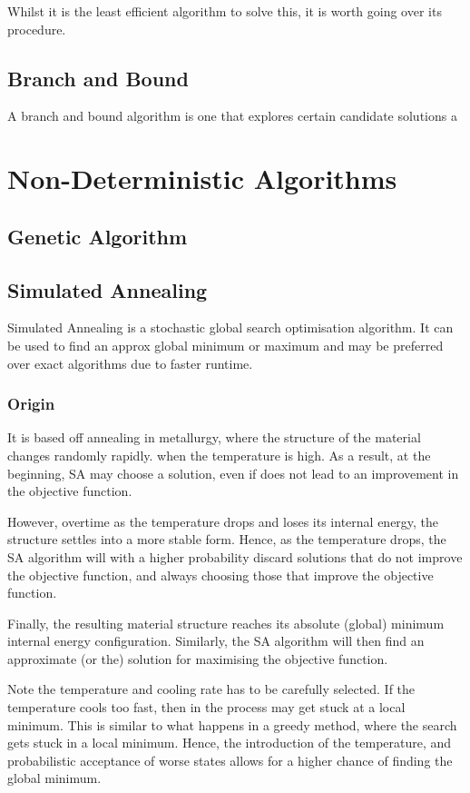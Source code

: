 \documentclass{article}
\begin{document}
Whilst it is the least efficient algorithm to solve this, it is worth going over its procedure.


\subsection{Branch and Bound}

A branch and bound algorithm is one that explores certain candidate solutions a

\section{Non-Deterministic Algorithms}

\subsection{Genetic Algorithm}

\subsection{Simulated Annealing}

Simulated Annealing is a stochastic global search optimisation algorithm.
It can be used to find an approx global minimum or maximum and may be preferred over exact algorithms due to faster runtime.
\\

\subsubsection{Origin}
It is based off annealing in metallurgy, where the structure of the material changes randomly rapidly. when the temperature is high.
As a result, at the beginning, SA may choose a solution, even if does not lead to an improvement in the objective function.

However, overtime as the temperature drops and loses its internal energy, the structure settles into a more stable form.
Hence, as the temperature drops, the SA algorithm will with a higher probability discard solutions that do not improve the objective function, and always choosing those that improve the objective function.

Finally, the resulting material structure reaches its absolute (global) minimum internal energy configuration.
Similarly, the SA algorithm will then find an approximate (or the) solution for maximising the objective function.

Note the temperature and cooling rate has to be carefully selected.
If the temperature cools too fast, then in the process may get stuck at a local minimum. 
This is similar to what happens in a greedy method, where the search gets stuck in a local minimum.
Hence, the introduction of the temperature, and probabilistic acceptance of worse states allows for a higher chance of finding the global minimum.
\\
\end{document}

